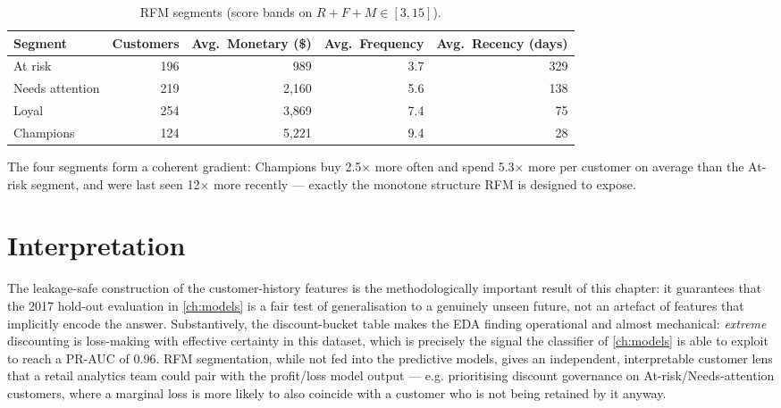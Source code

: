 \begin{table}[H]
  \centering
  \caption{RFM segments (score bands on $R+F+M \in[3,15]$).}
  \label{tab:rfm-segments}
  \begin{tabular}{@{}lrrrr@{}}
    \toprule
    Segment & Customers & Avg.\ Monetary (\$) & Avg.\ Frequency & Avg.\ Recency (days) \\
    \midrule
    At risk           & 196 & 989   & 3.7 & 329 \\
    Needs attention    & 219 & 2{,}160 & 5.6 & 138 \\
    Loyal              & 254 & 3{,}869 & 7.4 & 75 \\
    Champions          & 124 & 5{,}221 & 9.4 & 28 \\
    \bottomrule
  \end{tabular}
\end{table}
The four segments form a coherent gradient: Champions buy 2.5$\times$ more
often and spend 5.3$\times$ more per customer on average than the
At-risk segment, and were last seen 12$\times$ more recently — exactly
the monotone structure RFM is designed to expose.

\section{Interpretation}
The leakage-safe construction of the customer-history features is the
methodologically important result of this chapter: it guarantees that the
2017 hold-out evaluation in \cref{ch:models} is a fair test of
generalisation to a genuinely unseen future, not an artefact of features
that implicitly encode the answer. Substantively, the discount-bucket
table makes the EDA finding operational and almost mechanical:
\emph{extreme} discounting is loss-making with effective certainty in
this dataset, which is precisely the signal the classifier of
\cref{ch:models} is able to exploit to reach a PR-AUC of 0.96. RFM
segmentation, while not fed into the predictive models, gives an
independent, interpretable customer lens that a retail analytics team
could pair with the profit/loss model output — e.g. prioritising discount
governance on At-risk/Needs-attention customers, where a marginal loss
is more likely to also coincide with a customer who is not being
retained by it anyway.
